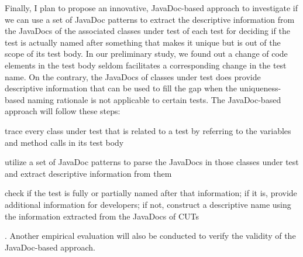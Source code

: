 Finally, I plan to propose an innovative, JavaDoc-based approach to investigate if we can use a set of JavaDoc patterns to extract the descriptive information from the JavaDocs of the associated classes under test of each test for deciding if the test is actually named after something that makes it unique but is out of the scope of its test body.
%
In our preliminary study, we found out a change of code elements in the test body seldom facilitates a corresponding change in the test name.
%
On the contrary, the JavaDocs of classes under test does provide descriptive information that can be used to fill the gap when the uniqueness-based naming rationale is not applicable to certain tests.
%
The JavaDoc-based approach will follow these steps:
\begin{enumerate*}
\item trace every class under test that is related to a test by referring to the variables and method calls in its test body
\item utilize a set of JavaDoc patterns to parse the JavaDocs in those classes under test and extract descriptive information from them
\item check if the test is fully or partially named after that information; if it is, provide additional information for developers; if not, construct a descriptive name using the information extracted from the JavaDocs of CUTs
\end{enumerate*}.
%
Another empirical evaluation will also be conducted to verify the validity of the JavaDoc-based approach.